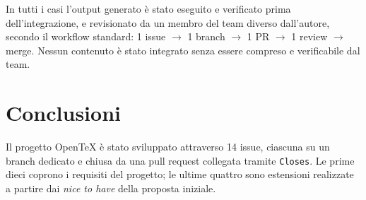 \documentclass[11pt,a4paper]{article}
\begin{document}
In tutti i casi l'output generato è stato eseguito e verificato prima dell'integrazione, e revisionato da un membro del team diverso dall'autore, secondo il workflow standard: 1 issue $\to$ 1 branch $\to$ 1 PR $\to$ 1 review $\to$ merge. Nessun contenuto è stato integrato senza essere compreso e verificabile dal team.

\section{Conclusioni}
\label{sec:conclusioni}

Il progetto OpenTeX è stato sviluppato attraverso 14 issue, ciascuna su un branch dedicato e chiusa da una pull request collegata tramite \texttt{Closes}. Le prime dieci coprono i requisiti del progetto; le ultime quattro sono estensioni realizzate a partire dai \emph{nice to have} della proposta iniziale.
\end{document}
